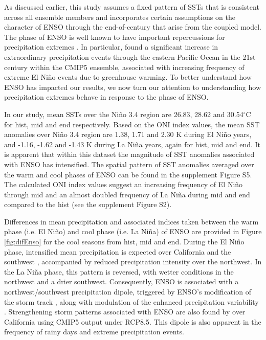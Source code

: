 As discussed earlier, this study assumes a fixed pattern of SSTs that is consistent across all ensemble members and incorporates certain assumptions on the character of ENSO through the end-of-century that arise from the coupled model.  The phase of ENSO is well known to have important repercussions for precipitation extremes \cite{larkin2005definition, allan2008atmospheric, maloney2014north, yoon2015increasing}. In particular, \cite{cai2014increasing} found a significant increase in extraordinary precipitation events through the eastern Pacific Ocean in the 21st century within the CMIP5 ensemble, associated with increasing frequency of extreme El Ni\~no events due to greenhouse warming.  To better understand how ENSO has impacted our results, we now turn our attention to understanding how precipitation extremes behave in response to the phase of ENSO.


In our study, mean SSTs over the Ni\~no 3.4 region are 26.83, 28.62 and 30.54$^\circ$C for \textsf{hist}, \textsf{mid} and \textsf{end} respectively. Based on the ONI index values, the mean SST anomalies over Ni\~no 3.4 region are 1.38, 1.71 and 2.30 K during El Ni\~no years, and -1.16, -1.62 and -1.43 K during La Ni\~na years, again for \textsf{hist}, \textsf{mid} and \textsf{end}. It is apparent that within this dataset the magnitude of SST anomalies associated with ENSO has intensified. The spatial pattern of SST anomalies averaged over the warm and cool phases of ENSO can be found in the supplement Figure S5. The calculated ONI index values suggest an increasing frequency of El Ni\~no through \textsf{mid} and an almost doubled frequency of La Ni\~na during \textsf{mid} and \textsf{end} compared to the \textsf{hist} (see the supplement Figure S2). 


Differences in mean precipitation and associated indices taken between the warm phase (i.e. El Ni\~no) and cool phase (i.e. La Ni\~na) of ENSO are provided in Figure \ref{fig:difEnso} for the cool seasons from \textsf{hist}, \textsf{mid} and \textsf{end}.  During the El Ni\~no phase, intensified mean precipitation is expected over California and the southwest \cite{hamlet2007effects}, accompanied by reduced precipitation intensity over the northwest. In the La Ni\~na phase, this pattern is reversed, with wetter conditions in the northwest and a drier southwest. Consequently, ENSO is associated with a northwest/southwest precipitation dipole, triggered by ENSO's modification of the storm track \cite{gershunov1998interdecadal, leung2003hydroclimate}, along with modulation of the enhanced precipitation variability \cite{cayan1999enso, kahya1994influences}. Strengthening storm patterns associated with ENSO are also found by \cite{maloney2014north} over California using CMIP5 output under RCP8.5.  This dipole is also apparent in the frequency of rainy days and extreme precipitation events. 

